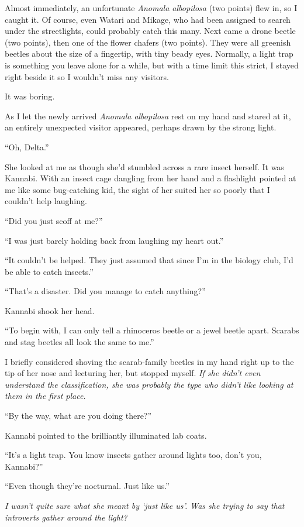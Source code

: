 \documentclass[
    a4paper,
    12pt,
    twoside,
    openany,
    UTF8,
    fontset=windows
]{ctexbook}
\begin{document}
Almost immediately, an unfortunate \textit{Anomala albopilosa} (two points) flew in, so I caught it. Of course, even Watari and Mikage, who had been assigned to search under the streetlights, could probably catch this many. Next came a drone beetle (two points), then one of the flower chafers (two points). They were all greenish beetles about the size of a fingertip, with tiny beady eyes. Normally, a light trap is something you leave alone for a while, but with a time limit this strict, I stayed right beside it so I wouldn't miss any visitors.

It was boring.

As I let the newly arrived \textit{Anomala albopilosa} rest on my hand and stared at it, an entirely unexpected visitor appeared, perhaps drawn by the strong light.

``Oh, Delta.''

She looked at me as though she'd stumbled across a rare insect herself. It was Kannabi. With an insect cage dangling from her hand and a flashlight pointed at me like some bug-catching kid, the sight of her suited her so poorly that I couldn't help laughing.

``Did you just scoff at me?''

``I was just barely holding back from laughing my heart out.''

``It couldn't be helped. They just assumed that since I'm in the biology club, I'd be able to catch insects.''

``That's a disaster. Did you manage to catch anything?''

Kannabi shook her head.

``To begin with, I can only tell a rhinoceros beetle or a jewel beetle apart. Scarabs and stag beetles all look the same to me.''

I briefly considered shoving the scarab-family beetles in my hand right up to the tip of her nose and lecturing her, but stopped myself. \textit{If she didn't even understand the classification, she was probably the type who didn't like looking at them in the first place.}

``By the way, what are you doing there?''

Kannabi pointed to the brilliantly illuminated lab coats.

``It's a light trap. You know insects gather around lights too, don't you, Kannabi?''

``Even though they're nocturnal. Just like us.''

\textit{I wasn't quite sure what she meant by `just like us'. Was she trying to say that introverts gather around the light?}
\end{document}
